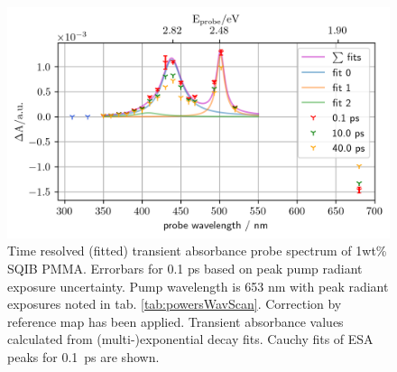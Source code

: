 \documentclass[twoside,openright,listof=numbered]{scrreprt}
\begin{document}
\begin{figure}[hbt]
\centering
\includegraphics[scale=1]{images/TimeResolvedWavelengthScanSQIB1perc_PMMA_fits.png}
\caption[Fitted transient absorbance probe spectrum of 1wt\% SQIB PMMA at pump \qty{653}{\nano\meter}.]{Time resolved (fitted) transient absorbance probe spectrum of 1wt\% SQIB PMMA. Errorbars for 0.1 ps based on peak pump radiant exposure uncertainty. Pump wavelength is 653 nm with peak radiant exposures noted in tab. \ref{tab:powersWavScan}. Correction by reference map has been applied. Transient absorbance values calculated from (multi-)exponential decay fits. Cauchy fits of ESA peaks for \qty{0.1}{\pico\second} are shown.\label{fig:SQIB_PMMAwavelengthscan}}
\end{figure}
\end{document}
